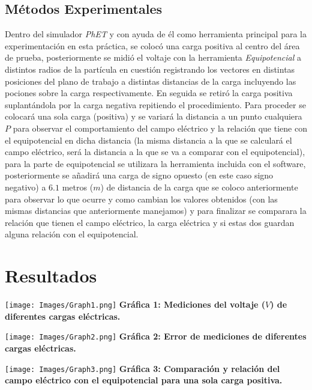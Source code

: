 \documentclass[a4paper,10pt]{article}
\begin{document}
\begin{multicols}{2}
\subsection{\textcolor{MiColor1}{\textbf{Métodos Experimentales}}}
Dentro del simulador \textit{PhET} y con ayuda de él como herramienta principal para la experimentación en esta práctica, se colocó una carga positiva al centro del área de prueba, posteriormente se midió el voltaje con la herramienta \textit{Equipotencial} a distintos radios de la partícula en cuestión registrando los vectores en distintas posiciones del plano de trabajo a distintas distancias de la carga incluyendo las pociones sobre la carga respectivamente. En seguida se retiró la carga positiva suplantándola por la carga negativa repitiendo el procedimiento. Para proceder se colocará una sola carga (positiva) y se variará la distancia a un punto cualquiera $P$ para observar el comportamiento del campo eléctrico y la relación que tiene con el equipotencial en dicha distancia (la misma distancia a la que se calculará el campo eléctrico, será la distancia a la que se va a comparar con el equipotencial), para la parte de equipotencial se utilizara la herramienta incluida con el software, posteriormente se añadirá una carga de signo opuesto (en este caso signo negativo) a $6.1$ metros ($m$) de distancia de la carga que se coloco anteriormente para observar lo que ocurre y como cambian los valores obtenidos (con las mismas distancias que anteriormente manejamos) y para finalizar se comparara la relación que tienen el campo eléctrico, la carga eléctrica y si estas dos guardan alguna relación con el equipotencial. \vspace{-1cm}
\section{\textcolor{MiColor1}{\textbf{Resultados}}}

\begin{center}
      \texttt{[image: Images/Graph1.png]}
      \textcolor{MiColor2}{\textbf{Gráfica 1: Mediciones del voltaje ($V$) de diferentes cargas eléctricas.}}
\end{center}

\begin{center}
   \texttt{[image: Images/Graph2.png]}
    \textcolor{MiColor2}{\textbf{Gráfica 2: Error de mediciones de diferentes cargas eléctricas.}}
\end{center}

\begin{center}
    \texttt{[image: Images/Graph3.png]}
    \textcolor{MiColor2}{\textbf{Gráfica 3: Comparación y relación del campo eléctrico con el equipotencial para una sola carga positiva.}}
\end{center}


\end{multicols}
\end{document}
